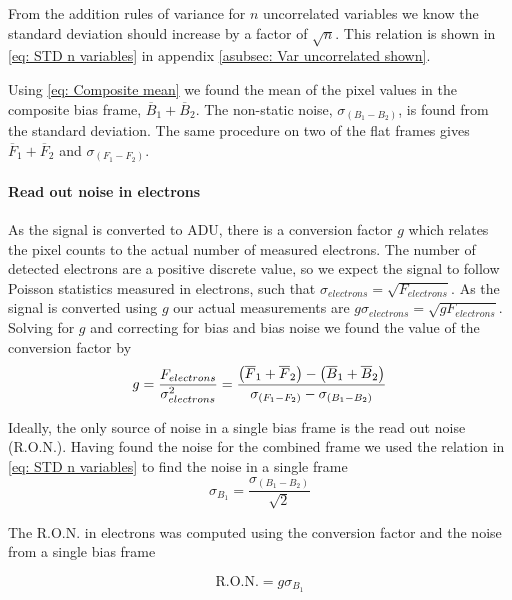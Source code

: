 \documentclass{emulateapj}
\begin{document}
From the addition rules of variance for $n$ uncorrelated variables \citep{STKbok} we know the standard deviation should increase by a factor of $\sqrt{n}$. This relation is shown in \cref{eq: STD n variables} in appendix \ref{asubsec: Var uncorrelated shown}.

Using \cref{eq: Composite mean} we found the mean of the pixel values in the composite bias frame, $\overline{B}_1 + \overline{B}_2$. The non-static noise, $\sigma_{(B_1-B_2)}$, is found from the standard deviation. The same procedure on two of the flat frames gives $\overline{F}_1 + \overline{F}_2$ and $\sigma_{(F_1-F_2)}$.

\paragraph{Read out noise in electrons}
As the signal is converted to ADU, there is a conversion factor $g$ which relates the pixel counts to the actual number of measured electrons. The number of detected electrons are a positive discrete value, so we expect the signal to follow Poisson statistics \citep{STKbok} measured in electrons, such that $\sigma_{electrons} = \sqrt{F_{electrons}}$. As the signal is converted using $g$ our actual measurements are $g\sigma_{electrons} = \sqrt{gF_{electrons}}$. Solving for $g$ and correcting for bias and bias noise we found the value of the conversion factor by
\begin{equation}
	g = \frac{F_{electrons}}{\sigma_{electrons}^2} = \frac{\qty(\overline{F}_1 + \overline{F}_2) - \qty(\overline{B}_1 + \overline{B}_2)}{\sigma_{(F_1-F_2)}-\sigma_{(B_1-B_2)}}
	\label{eq: Conversion factor}
\end{equation}

Ideally, the only source of noise in a single bias frame is the read out noise (R.O.N.). Having found the noise for the combined frame we used the relation in \cref{eq: STD n variables} to find the noise in a single frame 
\begin{equation}
	\sigma_{B_1} = \frac{\sigma_{(B_1-B_2)}}{\sqrt{2}}
	\label{eq: Noise one bias}
\end{equation}

The R.O.N. in electrons was computed using the conversion factor and the noise from a single bias frame

\begin{equation}
	\text{R.O.N.} = g\sigma_{B_1}
	\label{eq: R.O.N.}
\end{equation}
\end{document}
